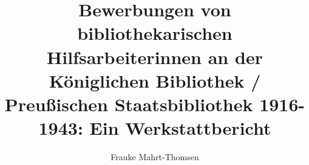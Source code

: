 
\fancyhead[R]{\thepage} %

\title{\LARGE{Bewerbungen von bibliothekarischen Hilfsarbeiterinnen an der Königlichen Bibliothek / Preußischen Staatsbibliothek 1916-1943}: Ein Werkstattbericht} %
\author{Frauke Mahrt-Thomsen} %
